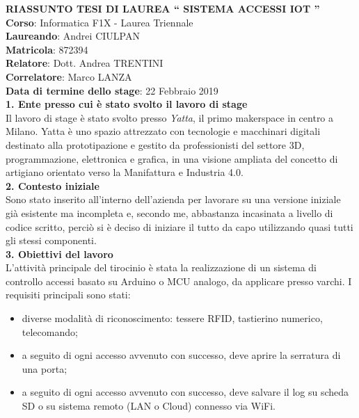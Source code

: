 \documentclass[11pt]{article}
\begin{document}
	
	\noindent\textbf{\large RIASSUNTO TESI DI LAUREA \textquotedblleft{} SISTEMA ACCESSI IOT \textquotedblright{}} 
	\vspace*{30px} \\
	\textbf{Corso}: Informatica F1X - Laurea Triennale \\
	\textbf{Laureando}: Andrei CIULPAN \\
	\textbf{Matricola}: 872394 \\
	\textbf{Relatore}: Dott. Andrea TRENTINI \\
	\textbf{Correlatore}: Marco LANZA \\
	\textbf{Data di termine dello stage}: 22 Febbraio 2019
	\vspace*{30px} \\
	
	\noindent\textbf{\large 1. Ente presso cui è stato svolto il lavoro di stage} \\
	\newline 
	Il lavoro di stage è stato svolto presso \emph{Yatta}, il primo makerspace in centro a Milano. Yatta è uno spazio attrezzato con tecnologie e macchinari digitali destinato alla prototipazione
	e gestito da professionisti del settore 3D, programmazione, elettronica e grafica, in una
	visione ampliata del concetto di artigiano orientato verso la Manifattura e Industria
	4.0.  \\
	\newline
	\noindent\textbf{\large 2. Contesto iniziale} \\
	\newline 
	Sono stato inserito all'interno dell'azienda per lavorare su una versione iniziale già esistente ma incompleta e, secondo me, abbastanza incasinata a livello di codice scritto, perciò si è deciso di iniziare il tutto da capo utilizzando quasi tutti gli stessi componenti.  \\
	\newline
	\noindent\textbf{\large 3. Obiettivi del lavoro} \\
	\newline 
	L’attività principale del tirocinio è stata la realizzazione di un sistema di controllo accessi basato su Arduino o MCU analogo, da applicare presso varchi. I requisiti principali sono stati: 
	\begin{itemize}
		\item diverse modalità di riconoscimento: tessere RFID, tastierino numerico, telecomando;
		\item a seguito di ogni accesso avvenuto con successo, deve aprire la serratura di una porta;
		\item a seguito di ogni accesso avvenuto con successo, deve salvare il log su scheda SD o su sistema remoto (LAN o Cloud) connesso via WiFi.  
	\end{itemize} 
\end{document}
